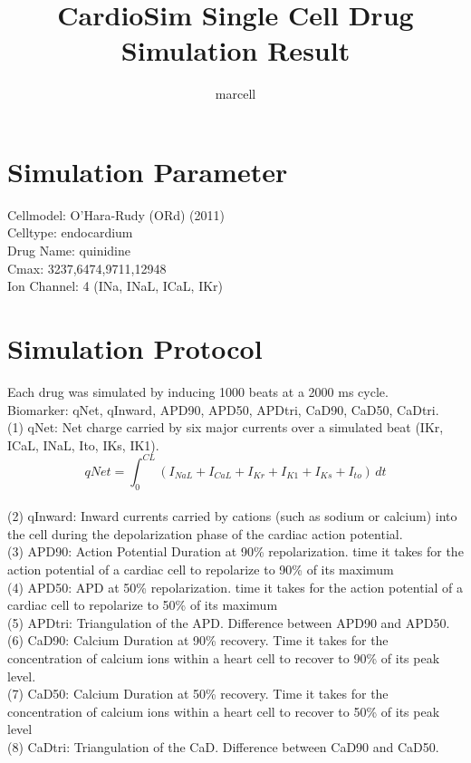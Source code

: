 \documentclass[11pt]{article}
\title{CardioSim Single Cell Drug Simulation Result}
\author{marcell}
\begin{document}
\maketitle
\section*{Simulation Parameter}
Cellmodel: O'Hara-Rudy (ORd) (2011)
\\Celltype: endocardium
\\Drug Name: quinidine
\\Cmax: 3237,6474,9711,12948
\\Ion Channel: 4 (INa, INaL, ICaL, IKr)
\section*{Simulation Protocol}
Each drug was simulated by inducing 1000 beats at a 2000 ms cycle.
\\Biomarker: qNet, qInward, APD90, APD50, APDtri, CaD90, CaD50, CaDtri.
\\(1) qNet: Net charge carried by six major currents over a simulated beat (IKr, ICaL, INaL, Ito, IKs, IK1).
\begin{equation}
	 qNet = \int_{0}^{CL} (I_{NaL} + I_{CaL} + I_{Kr} + I_{K1} + I_{Ks} + I_{to}) \,dt
	 \label{qnet}
\end{equation}
\\(2) qInward: Inward currents carried by cations (such as sodium or calcium) into the cell during the depolarization phase of the cardiac action potential.
\\(3) APD90: Action Potential Duration at 90\% repolarization. time it takes for the action potential of a cardiac cell to repolarize to 90\% of its maximum
\\(4) APD50: APD at 50\% repolarization. time it takes for the action potential of a cardiac cell to repolarize to 50\% of its maximum
\\(5)  APDtri: Triangulation of the APD. Difference between APD90 and APD50. 
\\(6)  CaD90: Calcium Duration at 90\% recovery. Time it takes for the concentration of calcium ions within a heart cell to recover to 90\% of its peak level.
\\(7)  CaD50: Calcium Duration at 50\% recovery. Time it takes for the concentration of calcium ions within a heart cell to recover to 50\% of its peak level
\\(8)  CaDtri: Triangulation of the CaD. Difference between CaD90 and CaD50.
\end{document}
